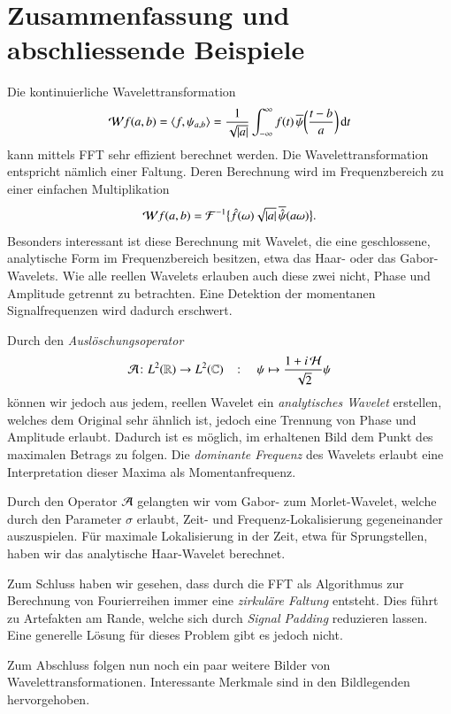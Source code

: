 \section{Zusammenfassung und abschliessende Beispiele}
Die kontinuierliche Wavelettransformation 
\begin{equation}
\Wave f (a,b)
=
\langle f,\psi_{a,b}\rangle
=
\frac{1}{\sqrt{|a|}}\int_{-\infty}^\infty f(t)\,
\overline{\psi}\biggl(\frac{t-b}{a}\biggr)\,\mathrm{d}t
\end{equation}
kann mittels FFT sehr effizient berechnet werden.
Die Wavelettransformation entspricht nämlich einer Faltung.
Deren Berechnung wird im Frequenzbereich zu einer einfachen Multiplikation
\begin{equation}
\Wave f(a,b)
= \mathcal{F}^{-1}\bigl\lbrace\hat{f}(\omega) \sqrt{|a|}\, \overline{\hat{\psi}}(a\omega)\bigr\rbrace.
\end{equation}
Besonders interessant ist diese Berechnung mit Wavelet, die eine geschlossene, analytische Form im Frequenzbereich besitzen, etwa das Haar- oder das Gabor-Wavelets.
Wie alle reellen Wavelets erlauben auch diese zwei nicht, Phase und Amplitude getrennt zu betrachten.
Eine Detektion der momentanen Signalfrequenzen wird dadurch erschwert.

Durch den \emph{Auslöschungsoperator}
\[
	\Ana\, \colon L^2(\mathbb R) \to L^2(\mathbb C)
	\quad\colon\quad
	\psi \mapsto \frac{1 + i\Hilb\,}{\sqrt 2}\psi
\]
können wir jedoch aus jedem, reellen Wavelet ein \emph{analytisches Wavelet} erstellen, welches dem Original sehr ähnlich ist, jedoch eine Trennung von Phase und Amplitude erlaubt.
Dadurch ist es möglich, im erhaltenen Bild dem Punkt des maximalen Betrags zu folgen.
Die \emph{dominante Frequenz} des Wavelets erlaubt eine Interpretation dieser Maxima als Momentanfrequenz.

Durch den Operator $\Ana\,$ gelangten wir vom Gabor- zum Morlet-Wavelet, welche durch den Parameter $\sigma$ erlaubt, Zeit- und Frequenz-Lokalisierung gegeneinander auszuspielen.
Für maximale Lokalisierung in der Zeit, etwa für Sprungstellen, haben wir das analytische Haar-Wavelet berechnet.

Zum Schluss haben wir gesehen, dass durch die FFT als Algorithmus zur Berechnung von Fourierreihen immer eine \emph{zirkuläre Faltung} entsteht.
Dies führt zu Artefakten am Rande, welche sich durch \emph{Signal Padding} reduzieren lassen.
Eine generelle Lösung für dieses Problem gibt es jedoch nicht.

Zum Abschluss folgen nun noch ein paar weitere Bilder von Wavelettransformationen.
Interessante Merkmale sind in den Bildlegenden hervorgehoben.


